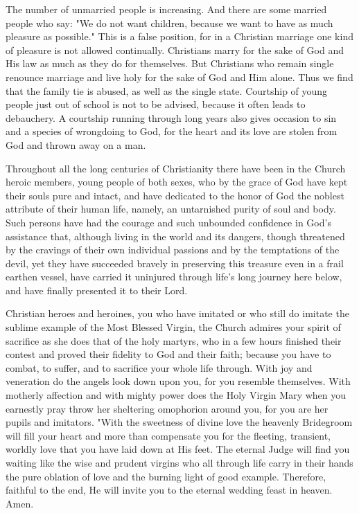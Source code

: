 The number of unmarried people is increasing.
And there are some married people who 
say: "We do not want children, because we 
want to have as much pleasure as possible." 
This is a false position, for in a Christian marriage
one kind of pleasure is not allowed continually.
Christians marry for the sake of God 
and His law as much as they do for themselves. 
But Christians who remain single renounce 
marriage and live holy for the sake of God and 
Him alone. Thus we find that the family tie is 
abused, as well as the single state. Courtship 
of young people just out of school is not to be 
advised, because it often leads to debauchery. 
A courtship running through long years also 
gives occasion to sin and a species of wrongdoing
to God, for the heart and its love are 
stolen from God and thrown away on a man. 

Throughout all the long centuries of Christianity
there have been in the Church heroic 
members, young people of both sexes, who by
the grace of God have kept their souls pure and 
intact, and have dedicated to the honor of God 
the noblest attribute of their human life, namely, 
an untarnished purity of soul and body. Such 
persons have had the courage and such unbounded
confidence in God's assistance that, 
although living in the world and its dangers, 
though threatened by the cravings of their own 
individual passions and by the temptations of 
the devil, yet they have succeeded bravely in 
preserving this treasure even in a frail earthen 
vessel, have carried it uninjured through life's 
long journey here below, and have finally presented
it to their Lord. 

Christian heroes and heroines, you who have 
imitated or who still do imitate the sublime example
of the Most Blessed Virgin, the Church 
admires your spirit of sacrifice as she does that 
of the holy martyrs, who in a few hours finished 
their contest and proved their fidelity to God 
and their faith; because you have to combat, to 
suffer, and to sacrifice your whole life through. 
With joy and veneration do the angels look down 
upon you, for you resemble themselves. With 
motherly affection and with mighty power does 
the Holy Virgin Mary when you earnestly pray 
throw her sheltering omophorion around you, 
for you are her pupils and imitators. "With the 
sweetness of divine love the heavenly Bridegroom 
will fill your heart and more than compensate 
you for the fleeting, transient, worldly love that 
you have laid down at His feet. The eternal 
Judge will find you waiting like the wise and 
prudent virgins who all through life carry in 
their hands the pure oblation of love and the 
burning light of good example. Therefore, faithful
to the end, He will invite you to the eternal 
wedding feast in heaven. Amen. 
